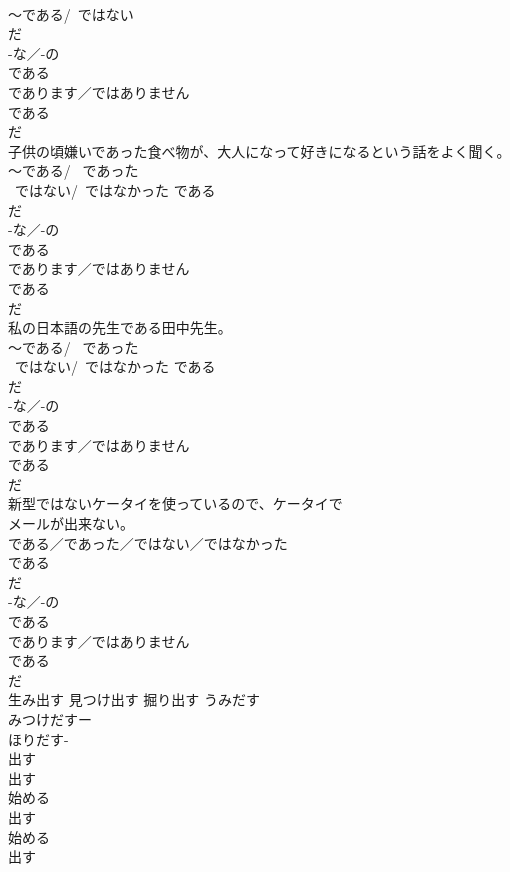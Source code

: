 \documentclass[8pt]{extreport}
\begin{document}
\begin{CJK}{UTF8}{min}
{\\	〜である/~ではない 
\\	だ 
\\	-な／-の 
\\	である 
\\	であります／ではありません 
\\	である 
\\	だ 
\\	子供の頃嫌いであった食べ物が、大人になって好きになるという話をよく聞く。	
\\	{〜である/ ~であった} 
\\	{~ではない/~ではなかった} である　
\\	だ 
\\	-な／-の 
\\	である 
\\	であります／ではありません 
\\	である 
\\	だ 
\\	私の日本語の先生である田中先生。	
\\	{〜である/ ~であった} 
\\	{~ではない/~ではなかった} である　
\\	だ 
\\	-な／-の 
\\	である 
\\	であります／ではありません 
\\	である 
\\	だ 
\\	新型ではないケータイを使っているので、ケータイで
\\	メールが出来ない。	
\\	{である／であった／ではない／ではなかった} 
\\	である 
\\	だ 
\\	-な／-の 
\\	である 
\\	であります／ではありません 
\\	である 
\\	だ 
\\	生み出す 見つけ出す 掘り出す	うみだす 
\\	みつけだすー 
\\	ほりだす- 
\\	出す 
\\	出す 
\\	始める 
\\	出す 
\\	始める 
\\	出す 
}
\end{CJK}
\end{document}
